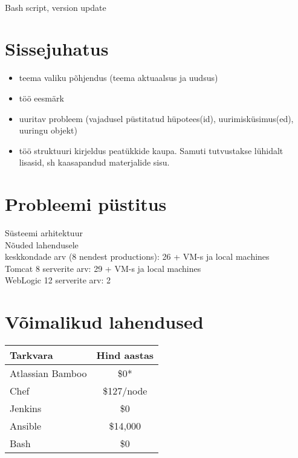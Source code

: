 \documentclass[12pt]{report}
\renewcommand{\headrulewidth}{0pt}
\begin{document}
  \\
  Bash script, version update
  
  \newpage
 
  \tableofcontents
  \fancypagestyle{plain}{%
    \renewcommand{\headrulewidth}{0pt}%
    \fancyhf{}%
    \fancyfoot[R]{\thepage}%
}
 
  \newpage
  
  \section*{Sissejuhatus}
  \label{sissejuhatus}
  
  \begin{itemize}
    \item teema valiku põhjendus (teema aktuaalsus ja uudsus)
    \item töö eesmärk
    \item  uuritav probleem (vajadusel püstitatud hüpotees(id), uurimisküsimus(ed), uuringu objekt)
    \item töö struktuuri kirjeldus peatükkide kaupa. Samuti tutvustakse lühidalt lisasid, sh kaasapandud
materjalide sisu.
  \end{itemize}
  
  \newpage
  
  \section{Probleemi püstitus}
  
  Süsteemi arhitektuur\\
  Nõuded lahendusele\\
  
  keskkondade arv (8 nendest productions): 26 + VM-s ja local machines\\
  Tomcat 8 serverite arv: 29 + VM-s ja local machines\\
  WebLogic 12 serverite arv: 2\\
  
  \newpage
  
  \section{Võimalikud lahendused}
  
  \begin{tabular}{| l | c |}
    \hline
    Tarkvara & Hind aastas\\
    \hline
    Atlassian Bamboo & \$0*\\
    Chef & \$127/node\\
    Jenkins & \$0\\
    Ansible & \$14,000\\
    Bash & \$0\\
    \hline
  \end{tabular}
\end{document}
